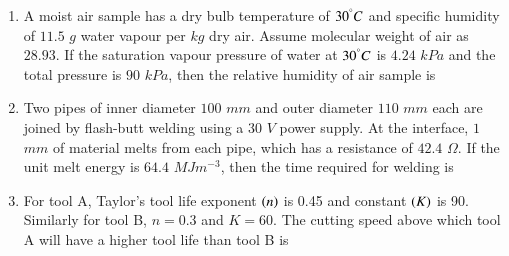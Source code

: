 \documentclass[journal,12pt,onecolumn]{IEEEtran}
\theoremstyle{remark}
\begin{document}
\begin{enumerate}
\item A moist air sample has a dry bulb temperature of $30^\degree C$ and specific humidity of $11.5$ $g$ water vapour per $kg$ dry air. Assume molecular weight of air as $28.93$. If the saturation vapour pressure of water at $30^\degree C$ is $4.24$ $kPa$ and the total pressure is $90$ $kPa$, then the relative humidity  of air sample is

\hfill{}
\begin{enumerate}
\end{enumerate}

\item Two pipes of inner diameter $100$ $mm$ and outer diameter $110$ $mm$ each are joined by flash-butt welding using a $30$ $V$ power supply. At the interface, $1$ $mm$ of material melts from each pipe, which has a resistance of $42.4$ $\Omega$. If the unit melt energy is $64.4$ $MJm^{-3}$, then the time required for welding  is

\hfill{}
\begin{enumerate}
\end{enumerate}

\item For tool A, Taylor's tool life exponent $\left(n\right)$ is 0.45 and constant $\left(K\right)$ is 90. Similarly for tool B, $n=0.3$ and $K=60$. The cutting speed  above which tool A will have a higher tool life than tool B is

\hfill{}
\begin{enumerate}
\end{enumerate}


\end{enumerate}
\end{document}
